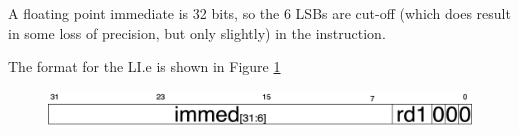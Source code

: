     A floating point immediate is 32 bits, so the 6 \glspl{LSB} are cut-off (which does result in some loss of precision, but only slightly) in the instruction.

    The format for the LI.e is shown in Figure \ref{fig:lie}

    \begin{figure}[H]
    \begin{center}
    \includegraphics[width=0.85\linewidth]{chapters/chapter4/img/lie.png} 
    \mycaption{}{}
    \label{fig:lie}
    \end{center}
    \end{figure}